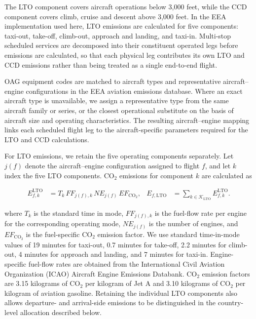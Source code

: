 \documentclass[12pt]{extarticle}
\begin{document}
The LTO component covers aircraft operations below 3,000 feet, while the CCD component covers climb, cruise and descent above 3,000 feet. In the EEA implementation used here, LTO emissions are calculated for five components: taxi-out, take-off, climb-out, approach and landing, and taxi-in. Multi-stop scheduled services are decomposed into their constituent operated legs before emissions are calculated, so that each physical leg contributes its own LTO and CCD emissions rather than being treated as a single end-to-end flight.

OAG equipment codes are matched to aircraft types and representative aircraft--engine configurations in the EEA aviation emissions database. Where an exact aircraft type is unavailable, we assign a representative type from the same aircraft family or series, or the closest operational substitute on the basis of aircraft size and operating characteristics. The resulting aircraft--engine mapping links each scheduled flight leg to the aircraft-specific parameters required for the LTO and CCD calculations.

For LTO emissions, we retain the five operating components separately. Let $j(f)$ denote the aircraft--engine configuration assigned to flight $f$, and let $k$ index the five LTO components. CO$_2$ emissions for component $k$ are calculated as

\begin{equation}
\begin{aligned}
E_{f,k}^{\mathrm{LTO}}
&=
T_k
\,FF_{j(f),k}
\,NE_{j(f)}
\,EF_{\mathrm{CO_2}},
&
E_{f,\mathrm{LTO}}
&=
\sum_{k\in\mathcal K_{\mathrm{LTO}}}
E_{f,k}^{\mathrm{LTO}}.
\end{aligned}
\label{eq:nature_2}
\end{equation}

where $T_k$ is the standard time in mode, $FF_{j(f),k}$ is the fuel-flow rate per engine for the corresponding operating mode, $NE_{j(f)}$ is the number of engines, and $EF_{\mathrm{CO_2}}$ is the fuel-specific CO$_2$ emission factor. We use standard time-in-mode values of 19 minutes for taxi-out, 0.7 minutes for take-off, 2.2 minutes for climb-out, 4 minutes for approach and landing, and 7 minutes for taxi-in. Engine-specific fuel-flow rates are obtained from the International Civil Aviation Organization (ICAO) Aircraft Engine Emissions Databank. CO$_2$ emission factors are 3.15 kilograms of CO$_2$ per kilogram of Jet A and 3.10 kilograms of CO$_2$ per kilogram of aviation gasoline. Retaining the individual LTO components also allows departure- and arrival-side emissions to be distinguished in the country-level allocation described below.
\end{document}
